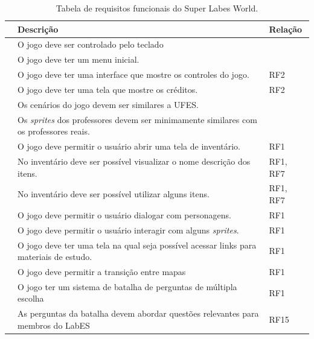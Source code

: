  
\begin{table}[h!]
	\caption{Tabela de requisitos funcionais do Super Labes World.}
	\label{tbl-requisitos-funcionais}
	\centering
	\renewcommand{\arraystretch}{2}
	\begin{small}
		\begin{tabular}{ | p{20mm} | p{102mm} | p{20mm} |}\hline \rowcolor{MidnightBlue}
			\centering{\textbf{Id}} & \textbf{Descrição} & \textbf{Relação} \\\hline		
                \centering{RF1} & O jogo deve ser controlado pelo teclado &  \\\hline
			\centering{RF2} & O jogo deve ter um menu inicial. &  \\\hline
                \centering{RF3} & O jogo deve ter uma interface que mostre os controles do jogo. & RF2 \\\hline
			\centering{RF4} & O jogo deve ter uma tela que mostre os créditos. & RF2 \\\hline
                \centering{RF5} & Os cenários do jogo devem ser similares a UFES. &  \\\hline
			\centering{RF6} & Os \textit{sprites} dos professores devem ser minimamente similares com os professores reais. &  \\\hline
			\centering{RF7} & O jogo deve permitir o usuário abrir uma tela de inventário. & RF1 \\\hline
			\centering{RF8} & No inventário deve ser possível visualizar o nome descrição dos itens. &  RF1, RF7\\\hline
			\centering{RF9} & No inventário deve ser possível utilizar alguns itens. & RF1, RF7  \\\hline
			\centering{RF10} & O jogo deve permitir o usuário dialogar com personagens. & RF1 \\\hline
			\centering{RF11} & O jogo deve permitir o usuário interagir com alguns \textit{sprites}. &  RF1\\\hline
			\centering{RF12} & O jogo deve ter uma tela na qual seja possível acessar links para materiais de estudo. &  RF1\\\hline
			\centering{RF13} & O jogo deve permitir a transição entre mapas & RF1 \\\hline
                \centering{RF14} & O jogo ter um sistema de batalha de perguntas de múltipla escolha &  RF1\\\hline
                \centering{RF15} & As perguntas da batalha devem abordar questões relevantes para membros do LabES &  RF15\\\hline

		\end{tabular}
	\end{small}
\end{table}

